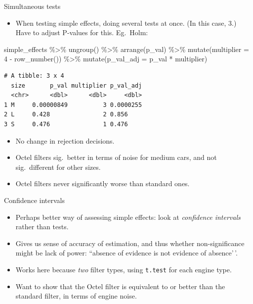 \documentclass[
  ignorenonframetext,
]{beamer}
\newenvironment{Shaded}{\begin{snugshade}}{\end{snugshade}}
\newcommand{\AttributeTok}[1]{\textcolor[rgb]{0.40,0.45,0.13}{#1}}
\newcommand{\DecValTok}[1]{\textcolor[rgb]{0.68,0.00,0.00}{#1}}
\newcommand{\FunctionTok}[1]{\textcolor[rgb]{0.28,0.35,0.67}{#1}}
\newcommand{\NormalTok}[1]{\textcolor[rgb]{0.00,0.23,0.31}{#1}}
\newcommand{\SpecialCharTok}[1]{\textcolor[rgb]{0.37,0.37,0.37}{#1}}
\providecommand{\tightlist}{%
  \setlength{\itemsep}{0pt}\setlength{\parskip}{0pt}}\usepackage{longtable,booktabs,array}
\begin{document}
\begin{frame}[fragile]{Simultaneous tests}
\protect\hypertarget{simultaneous-tests}{}
\begin{itemize}
\tightlist
\item
  When testing simple effects, doing several tests at once. (In this
  case, 3.) Have to adjust P-values for this. Eg.~Holm:
\end{itemize}

\footnotesize

\begin{Shaded}
\begin{Highlighting}[]
\NormalTok{simple\_effects }\SpecialCharTok{\%\textgreater{}\%} \FunctionTok{ungroup}\NormalTok{() }\SpecialCharTok{\%\textgreater{}\%} \FunctionTok{arrange}\NormalTok{(p\_val) }\SpecialCharTok{\%\textgreater{}\%}
  \FunctionTok{mutate}\NormalTok{(}\AttributeTok{multiplier =} \DecValTok{4} \SpecialCharTok{{-}} \FunctionTok{row\_number}\NormalTok{()) }\SpecialCharTok{\%\textgreater{}\%}
  \FunctionTok{mutate}\NormalTok{(}\AttributeTok{p\_val\_adj =}\NormalTok{ p\_val }\SpecialCharTok{*}\NormalTok{ multiplier)}
\end{Highlighting}
\end{Shaded}

\begin{verbatim}
# A tibble: 3 x 4
  size       p_val multiplier p_val_adj
  <chr>      <dbl>      <dbl>     <dbl>
1 M     0.00000849          3 0.0000255
2 L     0.428               2 0.856    
3 S     0.476               1 0.476    
\end{verbatim}

\normalsize

\footnotesize

\begin{itemize}
\item
  No change in rejection decisions.
\item
  Octel filters sig.~better in terms of noise for medium cars, and not
  sig.~different for other sizes.
\item
  Octel filters never significantly worse than standard ones.
\end{itemize}

\normalsize
\end{frame}

\begin{frame}[fragile]{Confidence intervals}
\protect\hypertarget{confidence-intervals}{}
\begin{itemize}
\item
  Perhaps better way of assessing simple effects: look at
  \emph{confidence intervals} rather than tests.
\item
  Gives us sense of accuracy of estimation, and thus whether
  non-significance might be lack of power: ``absence of evidence is not
  evidence of absence'\,'.
\item
  Works here because \emph{two} filter types, using \texttt{t.test} for
  each engine type.
\item
  Want to show that the Octel filter is equivalent to or better than the
  standard filter, in terms of engine noise.
\end{itemize}
\end{frame}
\end{document}
